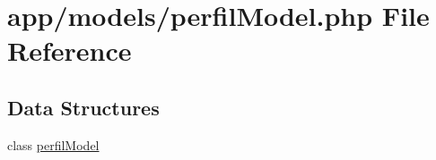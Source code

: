 \hypertarget{perfil_model_8php}{}\section{app/models/perfil\+Model.php File Reference}
\label{perfil_model_8php}
\subsection*{Data Structures}
\begin{DoxyCompactItemize}
\item 
class \hyperlink{classperfil_model}{perfil\+Model}
\end{DoxyCompactItemize}
